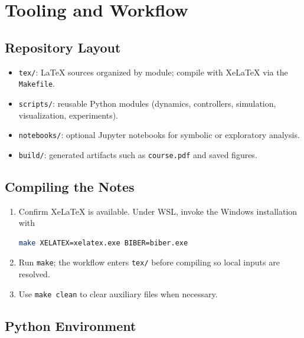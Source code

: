 \chapter{Tooling and Workflow}
\label{chap:tooling}

\section{Repository Layout}
\begin{itemize}[leftmargin=*]
    \item \texttt{tex/}: LaTeX sources organized by module; compile with Xe\LaTeX{} via the \texttt{Makefile}.
    \item \texttt{scripts/}: reusable Python modules (dynamics, controllers, simulation, visualization, experiments).
    \item \texttt{notebooks/}: optional Jupyter notebooks for symbolic or exploratory analysis.
    \item \texttt{build/}: generated artifacts such as \texttt{course.pdf} and saved figures.
\end{itemize}

\section{Compiling the Notes}
\begin{enumerate}[leftmargin=*]
    \item Confirm Xe\LaTeX{} is available. Under WSL, invoke the Windows installation with
\begin{lstlisting}[language=bash]
make XELATEX=xelatex.exe BIBER=biber.exe
\end{lstlisting}
    \item Run \texttt{make}; the workflow enters \texttt{tex/} before compiling so local inputs are resolved.
    \item Use \texttt{make clean} to clear auxiliary files when necessary.
\end{enumerate}

\section{Python Environment}

